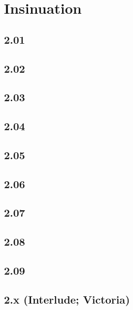 \part{Insinuation}
\chapter{2.01}


\chapter{2.02}


\chapter{2.03}


\chapter{2.04}


\chapter{2.05}


\chapter{2.06}


\chapter{2.07}


\chapter{2.08}


\chapter{2.09}


\chapter{2.x (Interlude; Victoria)}


